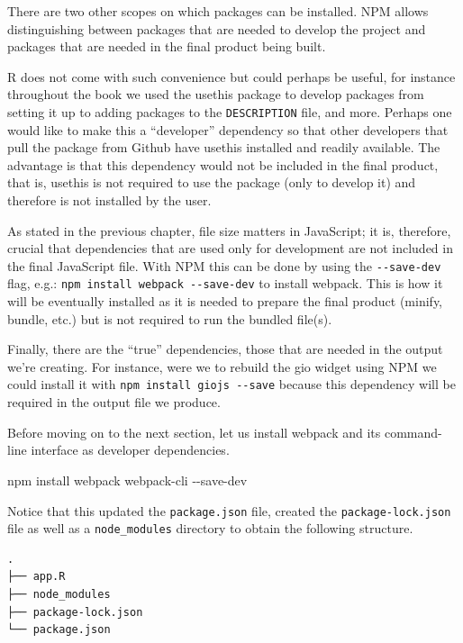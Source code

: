 \documentclass[
]{krantz}
\makeatletter
\newenvironment{Shaded}{\begin{snugshade}}{\end{snugshade}}
\newcommand{\ExtensionTok}[1]{#1}
\newcommand{\NormalTok}[1]{#1}
\newenvironment{kframe}{%
\medskip{}
\setlength{\fboxsep}{.8em}
 \def\at@end@of@kframe{}%
 \ifinner\ifhmode%
  \def\at@end@of@kframe{\end{minipage}}%
  \begin{minipage}{\columnwidth}%
 \fi\fi%
 \def\FrameCommand##1{\hskip\@totalleftmargin \hskip-\fboxsep
 \colorbox{shadecolor}{##1}\hskip-\fboxsep
     \hskip-\linewidth \hskip-\@totalleftmargin \hskip\columnwidth}%
 \MakeFramed {\advance\hsize-\width
   \@totalleftmargin\z@ \linewidth\hsize
   \@setminipage}}%
 {\par\unskip\endMakeFramed%
 \at@end@of@kframe}
\renewenvironment{Shaded}{\begin{kframe}}{\end{kframe}}
\makeatother
\begin{document}
There are two other scopes on which packages can be installed. NPM allows distinguishing between packages that are needed to develop the project and packages that are needed in the final product being built.

R does not come with such convenience but could perhaps be useful, for instance throughout the book we used the usethis package to develop packages from setting it up to adding packages to the \texttt{DESCRIPTION} file, and more. Perhaps one would like to make this a ``developer'' dependency so that other developers that pull the package from Github have usethis installed and readily available. The advantage is that this dependency would not be included in the final product, that is, usethis is not required to use the package (only to develop it) and therefore is not installed by the user.

As stated in the previous chapter, file size matters in JavaScript; it is, therefore, crucial that dependencies that are used only for development are not included in the final JavaScript file. With NPM this can be done by using the \texttt{-\/-save-dev} flag, e.g.: \texttt{npm\ install\ webpack\ -\/-save-dev} to install webpack. This is how it will be eventually installed as it is needed to prepare the final product (minify, bundle, etc.) but is not required to run the bundled file(s).

Finally, there are the ``true'' dependencies, those that are needed in the output we're creating. For instance, were we to rebuild the gio widget using NPM we could install it with \texttt{npm\ install\ giojs\ -\/-save} because this dependency will be required in the output file we produce.

Before moving on to the next section, let us install webpack and its command-line interface as developer dependencies.

\begin{Shaded}
\begin{Highlighting}[]
\ExtensionTok{npm}\NormalTok{ install webpack webpack{-}cli {-}{-}save{-}dev}
\end{Highlighting}
\end{Shaded}

Notice that this updated the \texttt{package.json} file, created the \texttt{package-lock.json} file as well as a \texttt{node\_modules} directory to obtain the following structure.

\begin{verbatim}
.
├── app.R
├── node_modules
├── package-lock.json
└── package.json
\end{verbatim}
\end{document}
